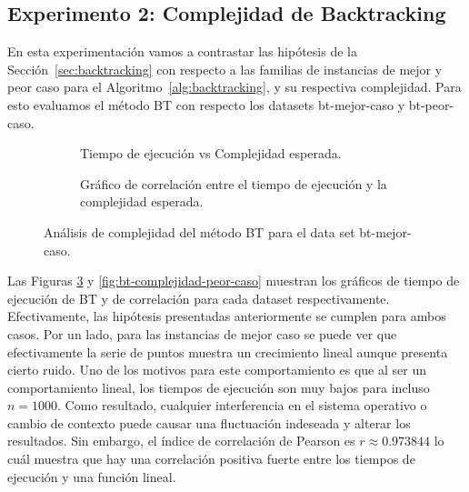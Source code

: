 \documentclass[10pt,a4paper]{article}
\begin{document}
\subsection{Experimento 2: Complejidad de Backtracking}
En esta experimentación vamos a contrastar las hipótesis de la Sección~\ref{sec:backtracking} con respecto a las familias de instancias de mejor y peor caso para el Algoritmo~\ref{alg:backtracking}, y su respectiva complejidad. Para esto evaluamos el método BT con respecto los datasets bt-mejor-caso y bt-peor-caso. 

\begin{figure}
    \centering
    \begin{subfigure}{0.45\linewidth}
        \centering
        
        \caption{Tiempo de ejecución vs Complejidad esperada.}
        \label{fig:bt-complejidad-mejor-caso-a}
    \end{subfigure}
    \begin{subfigure}{0.45\linewidth}
        \centering
        
        \caption{Gráfico de correlación entre el tiempo de ejecución y la complejidad esperada.}
        \label{fig:bt-complejidad-mejor-caso-b}
    \end{subfigure}
    \caption{Análisis de complejidad del método BT para el data set bt-mejor-caso.}
    \label{fig:bt-complejidad-mejor-caso}
\end{figure}

Las Figuras \ref{fig:bt-complejidad-mejor-caso} y \ref{fig:bt-complejidad-peor-caso} muestran los gráficos de tiempo de ejecución de BT y de correlación para cada dataset respectivamente. Efectivamente, las hipótesis presentadas anteriormente se cumplen para ambos casos. Por un lado, para las instancias de mejor caso se puede ver que efectivamente la serie de puntos muestra un crecimiento lineal aunque presenta cierto ruido. Uno de los motivos para este comportamiento es que al ser un comportamiento lineal, los tiempos de ejecución son muy bajos para incluso $n=1000$. Como resultado, cualquier interferencia en el sistema operativo o cambio de contexto puede causar una fluctuación indeseada y alterar los resultados. Sin embargo, el índice de correlación de Pearson es $r \approx 0.973844$ lo cuál muestra que hay una correlación positiva fuerte entre los tiempos de ejecución y una función lineal.
\end{document}

